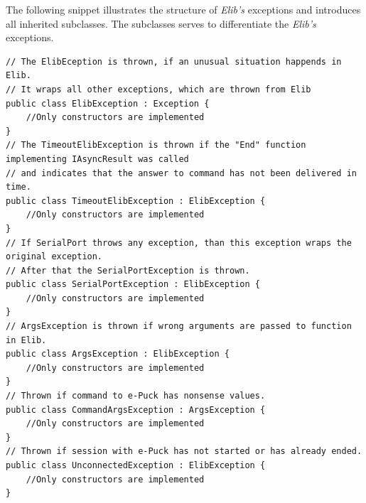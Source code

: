 \documentclass[12pt,notitlepage]{report}
\begin{document}
	The following snippet illustrates the structure of {\it Elib's} exceptions and
	introduces all inherited subclasses.
	The subclasses serves to differentiate the {\it Elib's} exceptions.
\begin{lstlisting}
// The ElibEception is thrown, if an unusual situation happends in Elib.
// It wraps all other exceptions, which are thrown from Elib
public class ElibException : Exception { 
	//Only constructors are implemented
}
// The TimeoutElibException is thrown if the "End" function implementing IAsyncResult was called 
// and indicates that the answer to command has not been delivered in time.
public class TimeoutElibException : ElibException { 
	//Only constructors are implemented
}
// If SerialPort throws any exception, than this exception wraps the original exception.
// After that the SerialPortException is thrown.
public class SerialPortException : ElibException {
	//Only constructors are implemented
}
// ArgsException is thrown if wrong arguments are passed to function in Elib.
public class ArgsException : ElibException {
	//Only constructors are implemented
}
// Thrown if command to e-Puck has nonsense values.
public class CommandArgsException : ArgsException {
	//Only constructors are implemented
}
// Thrown if session with e-Puck has not started or has already ended.
public class UnconnectedException : ElibException {
	//Only constructors are implemented
}

\end{lstlisting}




\end{document}
